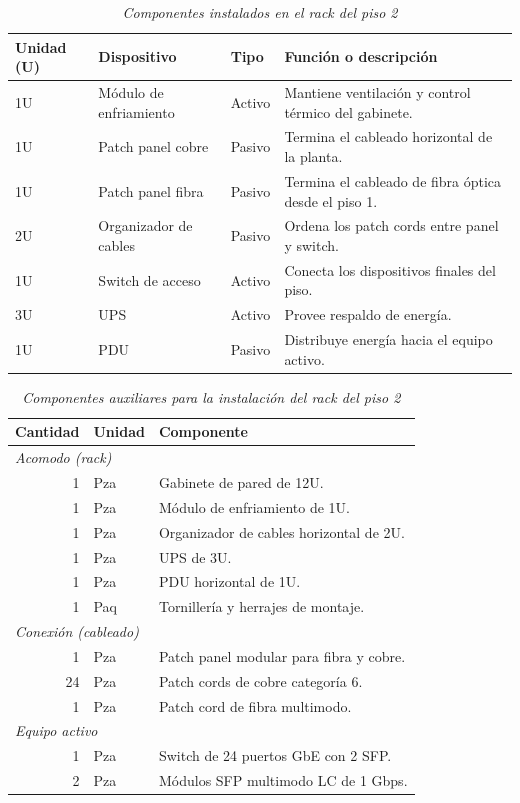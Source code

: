 \begin{table}[H]
  \caption{\textit{Componentes instalados en el rack del piso 2}}
  \label{tab:rack_piso2}
  \centering
  \begin{tabularx}{\textwidth}{l l l X}
    	\toprule
    	\textbf{Unidad (U)} & \textbf{Dispositivo} & \textbf{Tipo} & \textbf{Función o descripción} \\
    \midrule
    1U & Módulo de enfriamiento & Activo & Mantiene ventilación y control térmico del gabinete. \\
    1U & Patch panel cobre& Pasivo & Termina el cableado horizontal de la planta. \\
    1U & Patch panel fibra & Pasivo & Termina el cableado de fibra óptica desde el piso 1. \\
    2U & Organizador de cables & Pasivo & Ordena los patch cords entre panel y switch. \\
    1U & Switch de acceso & Activo & Conecta los dispositivos finales del piso. \\
    3U & UPS & Activo & Provee respaldo de energía. \\
    1U & PDU & Pasivo & Distribuye energía hacia el equipo activo. \\
    \bottomrule
  \end{tabularx}
\end{table}

\begin{table}[H]
  \caption{\textit{Componentes auxiliares para la instalación del rack del piso 2}}
  \label{tab:bom_piso2}
  \centering
  \begin{tabularx}{\textwidth}{r l X}
    	\toprule
    	\textbf{Cantidad} & \textbf{Unidad} & \textbf{Componente} \\
    \midrule
    \multicolumn{3}{l}{\textit{Acomodo (rack)}} \\
    1 & Pza & Gabinete de pared de 12U. \\
    1 & Pza & Módulo de enfriamiento de 1U. \\
    1 & Pza & Organizador de cables horizontal de 2U. \\
    1 & Pza & UPS de 3U. \\
    1 & Pza & PDU horizontal de 1U. \\
    1 & Paq & Tornillería y herrajes de montaje. \\
    \multicolumn{3}{l}{\textit{Conexión (cableado)}} \\
    1 & Pza & Patch panel modular para fibra y cobre. \\
    24 & Pza & Patch cords de cobre categoría 6. \\
    1 & Pza & Patch cord de fibra multimodo. \\
    \multicolumn{3}{l}{\textit{Equipo activo}} \\
    1 & Pza & Switch de 24 puertos GbE con 2 SFP. \\
    2 & Pza & Módulos SFP multimodo LC de 1 Gbps. \\
    \bottomrule
  \end{tabularx}
\end{table}


